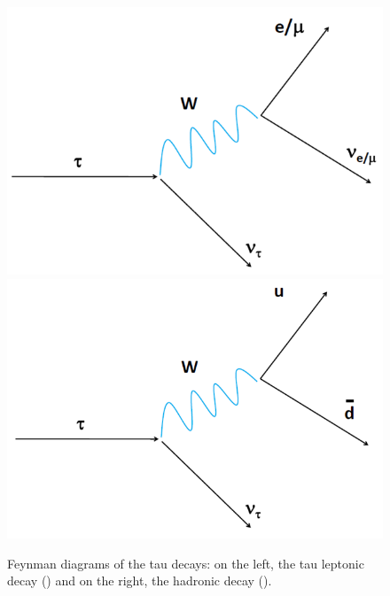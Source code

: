 \begin{center}
\begin{figure}[ht]
\centering
\includegraphics[scale=0.6]{figuras/Chapter1/leptondecay.png}
\includegraphics[scale=0.5]{figuras/Chapter1/hadrondecay.png}
\caption{Feynman diagrams of the tau decays: on the left, the tau leptonic decay (\tauell) and on the right,
the hadronic decay (\tauh).
} 
\label{taudecays}
\end{figure}
\end{center}



